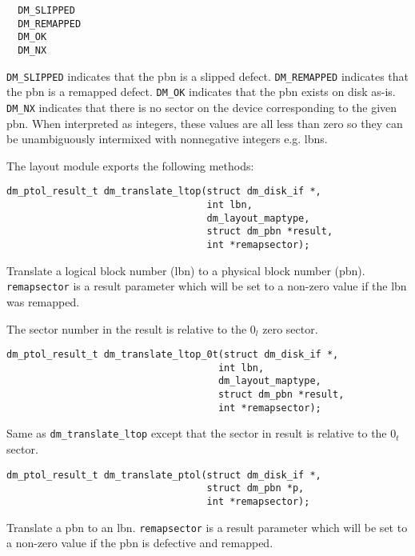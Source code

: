 \begin{verbatim}
  DM_SLIPPED
  DM_REMAPPED
  DM_OK
  DM_NX
\end{verbatim}

\texttt{DM\_SLIPPED} indicates that the pbn is a slipped defect.
\texttt{DM\_REMAPPED} indicates that the pbn is a remapped defect.
\texttt{DM\_OK} indicates that the pbn exists on disk as-is.  \texttt{DM\_NX}
indicates that there is no sector on the device corresponding to the
given pbn.  When interpreted as integers, these values are all less
than zero so they can be unambiguously intermixed with nonnegative
integers e.g. lbns.



The layout module exports the following methods:

\begin{verbatim}
dm_ptol_result_t dm_translate_ltop(struct dm_disk_if *, 
                                   int lbn, 
                                   dm_layout_maptype,
                                   struct dm_pbn *result,
                                   int *remapsector);
\end{verbatim}

Translate a logical block number (lbn) to a physical block number
(pbn).  \texttt{remapsector} is a result parameter which will be set
to a non-zero value if the lbn was remapped.

The sector number in the result is relative to the $0_l$ zero sector.




\begin{verbatim}
dm_ptol_result_t dm_translate_ltop_0t(struct dm_disk_if *, 
                                     int lbn, 
                                     dm_layout_maptype,
                                     struct dm_pbn *result,
                                     int *remapsector);
\end{verbatim}


Same as \texttt{dm\_translate\_ltop} except that the sector in 
result is relative to the $0_t$ sector.



\begin{verbatim}
dm_ptol_result_t dm_translate_ptol(struct dm_disk_if *, 
                                   struct dm_pbn *p,
                                   int *remapsector);
\end{verbatim}

Translate a pbn to an lbn.  \texttt{remapsector} is a result parameter
which will be set to a non-zero value if the pbn is defective and
remapped.

